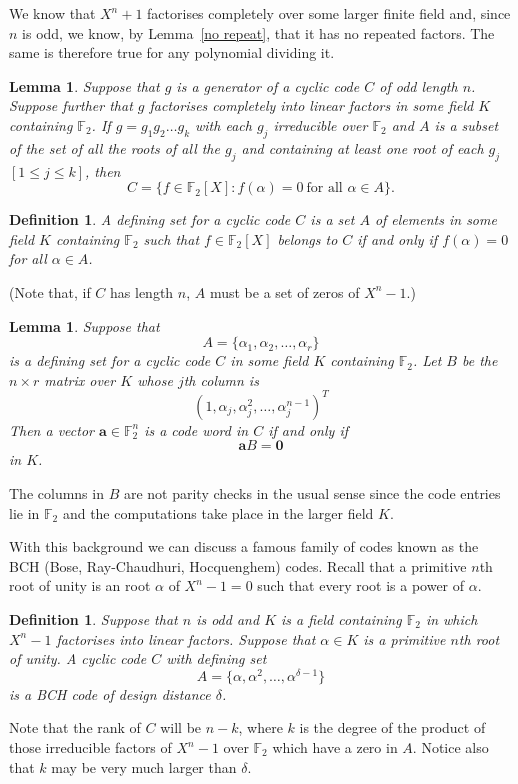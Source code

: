 \documentclass[12pt,a4paper]{article}
\theoremstyle{plain}
\newtheorem{lemma}[theorem]{Lemma}
\newtheorem{definition}[theorem]{Definition}
\theoremstyle{definition}
\begin{document}
We know that $X^{n}+1$ factorises completely
over some
larger finite field and, since $n$ is odd,
we know, by Lemma~\ref{no repeat},
that it has no
repeated factors. The same is therefore
true for any polynomial dividing it.
\begin{lemma} Suppose that $g$ is a
generator of a cyclic code $C$ of
odd length $n$. Suppose further
that $g$ factorises
completely into linear factors in some
field $K$ containing ${\mathbb F}_{2}$.
If $g=g_{1}g_{2}\dots g_{k}$ with each $g_{j}$ irreducible
over ${\mathbb F}_{2}$
and $A$ is a subset of the set of all the roots of
all the $g_{j}$ 
and containing at least one root
of each $g_{j}$ $[1\leq j\leq k]$,
then
\[C=\{f\in {\mathbb F}_{2}[X]:f(\alpha)=0 
\ \text{for all $\alpha\in A$}\}.\]
\end{lemma}
\begin{definition} A \emph{defining set} for a cyclic
code $C$ is a set $A$ of elements in some
field $K$ containing ${\mathbb F}_{2}$
such that $f\in{\mathbb F}_{2}[X]$ belongs
to $C$ if and only if $f(\alpha)=0$
for all $\alpha\in A$.
\end{definition}
\noindent
(Note that, if $C$ has length $n$,
$A$ must be a set of zeros
of $X^{n}-1$.)

\begin{lemma}\label{field check} Suppose that
\[A=\{\alpha_{1},\alpha_{2},\dots,\alpha_{r}\}\]
is a defining set for a cyclic
code $C$  in some
field $K$ containing ${\mathbb F}_{2}$.
Let $B$ be the $n\times r$ matrix over $K$
whose $j$th column is
\[(1,\alpha_{j},\alpha_{j}^{2},\dots,\alpha_{j}^{n-1})^{T}\]
Then a vector ${\mathbf a}\in{\mathbb F}_{2}^{n}$
is a code word in $C$ if and only if
\[{\mathbf a}B={\boldsymbol 0}\]
in $K$.
\end{lemma}
\noindent
The columns in $B$ are not parity checks in the usual
sense since the code entries lie in ${\mathbb F}_{2}$
and the computations take place in the larger field $K$.

With this background we can
discuss a famous family of codes known as
the BCH (Bose, Ray-Chaudhuri, Hocquenghem) codes.
Recall that a primitive $n$th root of unity is
an root $\alpha$ of $X^{n}-1=0$
such that every root is a power of $\alpha$.
\begin{definition}\label{definition BCH}
Suppose that $n$ is odd
and $K$ is a field containing
${\mathbb F}_{2}$ in which $X^{n}-1$ factorises into
linear factors. Suppose that
$\alpha\in K$ is a primitive
$n$th root of unity.
A cyclic code $C$ with defining set
\[A=\{\alpha,\alpha^{2},\dots,\alpha^{\delta-1}\}\]
is a \emph{BCH code of design distance} $\delta$.
\end{definition}
\noindent
Note that the rank of $C$ will be $n-k$, where $k$
is the degree of the product of
those irreducible factors
of $X^{n}-1$ over ${\mathbb F}_{2}$ which have a
zero in $A$. Notice also
that $k$ may be very much larger
than $\delta$.
\end{document}
